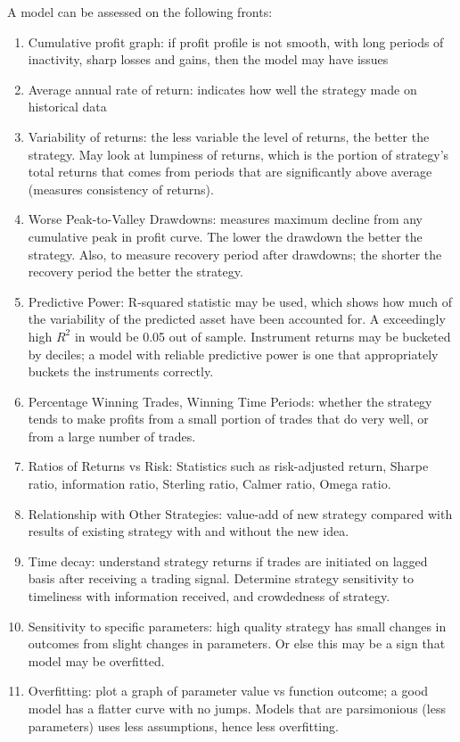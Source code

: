  A model can be assessed on the following fronts:
\begin{enumerate}[label=\roman*.]
\setlength{\itemsep}{0pt}
\item Cumulative profit graph: if profit profile is not smooth, with long periods of inactivity, sharp losses and gains, then the model may have issues
\item Average annual rate of return: indicates how well the strategy made on historical data
\item Variability of returns: the less variable the level of returns, the better the strategy. May look at lumpiness of returns, which is the portion of strategy's total returns that comes from periods that are significantly above average (measures consistency of returns).
\item Worse Peak-to-Valley Drawdowns: measures maximum decline from any cumulative peak in profit curve. The lower the drawdown the better the strategy. Also, to measure recovery period after drawdowns; the shorter the recovery period the better the strategy.
\item Predictive Power: R-squared statistic may be used, which shows how much of the variability of the predicted asset have been accounted for. A exceedingly high $R^2$ in would be 0.05 out of sample. Instrument returns may be bucketed by deciles; a model with reliable predictive power is one that appropriately buckets the instruments correctly.
\item Percentage Winning Trades, Winning Time Periods: whether the strategy tends to make profits from a small portion of trades that do very well, or from a large number of trades. 
\item Ratios of Returns vs Risk: Statistics such as risk-adjusted return, Sharpe ratio, information ratio, Sterling ratio, Calmer ratio, Omega ratio.
\item Relationship with Other Strategies: value-add of new strategy compared with results of existing strategy with and without the new idea.
\item Time decay: understand strategy returns if trades are initiated on lagged basis after receiving a trading signal. Determine strategy sensitivity to timeliness with information received, and crowdedness of strategy.
\item Sensitivity to specific parameters: high quality strategy has small changes in outcomes from slight changes in parameters. Or else this may be a sign that model may be overfitted.
\item Overfitting: plot a graph of parameter value vs function outcome; a good model has a flatter curve with no jumps.  Models that are parsimonious (less parameters) uses less assumptions, hence less overfitting.
\end{enumerate}

